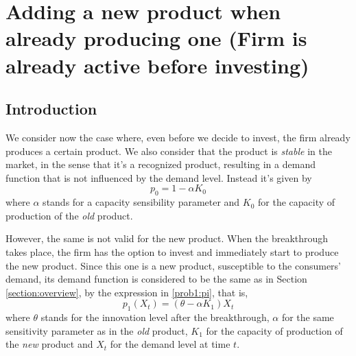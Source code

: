 
\chapter{Adding a new product when already producing one (Firm is already active before investing)}
\label{chapter:2}



\section{Introduction}
\label{section:2_intro}

We consider now the case where, even before we decide to invest, the firm already produces a certain product. We also consider that the product is \textit{stable} in the market, in the sense that it's a recognized product, resulting in a demand function that is not influenced by the demand level. Instead it's given by
\begin{equation}
p_0=1-\alpha K_0
\label{p0}
\end{equation}
where $\alpha$ stands for a capacity sensibility parameter and $K_0$ for the capacity of production of the \textit{old} product. 

However, the same is not valid for the new product. When the breakthrough takes place, the firm has the option to invest and immediately start to produce the new product. Since this one is a new product, susceptible to the consumers' demand, its demand function is considered to be the same as in Section \ref{section:overview}, by the expression in \eqref{prob1:pi}, that is,
\begin{equation}
p_1(X_t)=(\theta-\alpha K_1)X_t
\label{p1}
\end{equation}
where $\theta$ stands for the innovation level after the breakthrough, $\alpha$ for the same sensitivity parameter as in the \textit{old} product, $K_1$ for the capacity of production of the \textit{new} product and $X_t$ for the demand level at time $t$.

